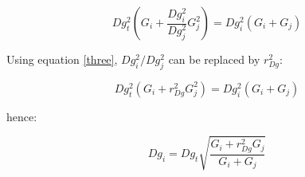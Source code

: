 \documentclass[a4paper]{article}
\begin{document}
\begin{equation*}\label{}
  Dg_t^2(G_i + \frac{Dg_i^2}{Dg_j^2}G_j^2)= Dg_i^2(G_i + G_j)
\end{equation*}

\noindent Using equation \ref{three}, $Dg_i^2 / Dg_j^2$ can be replaced by $r_{Dg}^2$:

\begin{equation*}\label{}
  Dg_t^2(G_i + r_{Dg}^2G_j^2)= Dg_i^2(G_i + G_j)
\end{equation*}

\noindent hence:

\begin{equation*}\label{}
  Dg_i = Dg_t\sqrt{\frac{G_i + r_{Dg}^2G_j}{G_i + G_j}}
\end{equation*}
\end{document}
